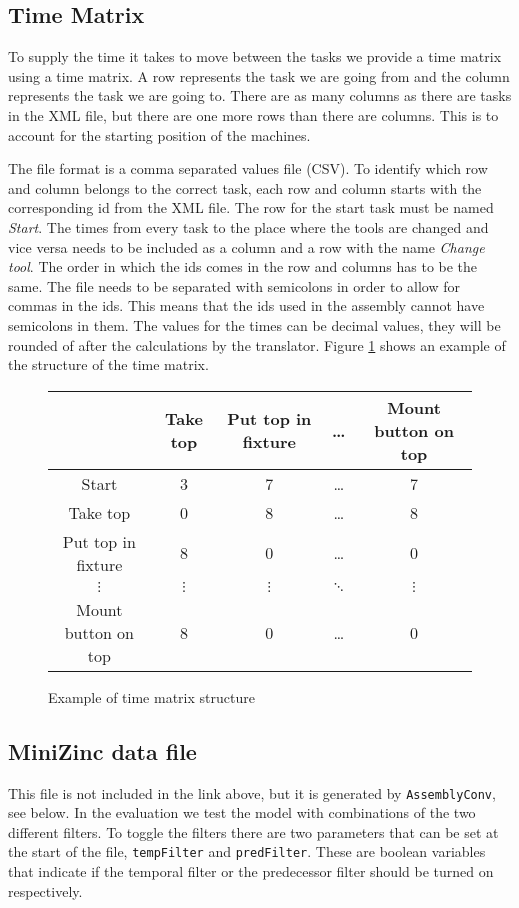\subsection{Time Matrix}\label{sec:time_matrix}
To supply the time it takes to move between the tasks we provide a time matrix using a time matrix. A row represents the task we are going from and the column represents the task we are going to. There are as many columns as there are tasks in the XML file, but there are one more rows than there are columns. This is to account for the starting position of the machines.

The file format is a comma separated values file (CSV). To identify which row and column belongs to the correct task, each row and column starts with the corresponding id from the XML file. The row for the start task must be named \emph{Start}. The times from every task to the place where the tools are changed and vice versa needs to be included as a column and a row with the name \emph{Change tool}. The order in which the ids comes in the row and columns has to be the same. The file needs to be separated with semicolons in order to allow for commas in the ids. This means that the ids used in the assembly cannot have semicolons in them. The values for the times can be decimal values, they will be rounded of after the calculations by the translator. Figure \ref{fig:time_matrix} shows an example of the structure of the time matrix.

\begin{figure}[h]
\begin{tabular}{c|c|c|c|c}
& Take top & Put top in fixture & \dots & Mount button on top\\\hline
Start & 3 & 7 & \dots & 7\\\hline
Take top & 0 & 8 & \dots & 8\\\hline
Put top in fixture & 8 & 0 & \dots & 0\\\hline
$\vdots$ & $\vdots$ & $\vdots$ & $\ddots$ & $\vdots$\\\hline
Mount button on top & 8 & 0 & \dots & 0
\end{tabular}
\caption{Example of time matrix structure}
\label{fig:time_matrix}
\end{figure}

\subsection{MiniZinc data file}
This file is not included in the link above, but it is generated by \texttt{AssemblyConv}, see below. In the evaluation we test the model with combinations of the two different filters. To toggle the filters there are two parameters that can be set at the start of the file, \texttt{tempFilter} and \texttt{predFilter}. These are boolean variables that indicate if the temporal filter or the predecessor filter should be turned on respectively.

